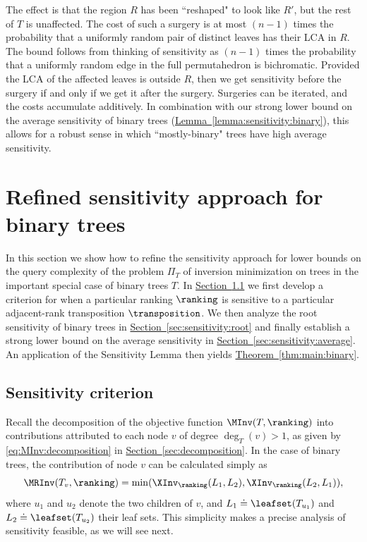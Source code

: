 \documentclass[11pt]{article}
\numberwithin{equation}{section}
\theoremstyle{definition}
\theoremstyle{plain}
\newcommand{\expref}[2]{\hyperref[#2]{#1~\ref{#2}}}
\begin{document}
The effect is that the region $R$ has been ``reshaped" to look like $R'$, but the rest of $T$ is unaffected. The cost of such a surgery is at most $(n-1)$ times the probability that a 
uniformly random pair of distinct leaves has their LCA in $R$. The bound follows from thinking of sensitivity as $(n-1)$ times the probability that a uniformly random edge in the full permutahedron is bichromatic. Provided the LCA of 
the affected leaves is outside $R$, then we get sensitivity before the surgery if and only if we get it after the surgery. Surgeries can be iterated, and the costs accumulate additively. In combination with our strong lower bound on the average sensitivity of binary trees (\expref{Lemma}{lemma:sensitivity:binary}), this allows for a robust sense in which ``mostly-binary" trees have high average sensitivity.



\section{Refined sensitivity approach for binary trees}
\label{sec:sensitivity:binary}

In this section we show how to refine the sensitivity approach for lower bounds on the query complexity of the problem $\Pi_T$ of inversion minimization on trees in the important special case of binary trees $T$. In \expref{Section}{sec:binary:criterion} we first develop a criterion for when a particular ranking $\ranking$ is sensitive to a particular adjacent-rank transposition $\transposition$.
We then analyze the root sensitivity of binary trees in \expref{Section}{sec:sensitivity:root} and finally establish a strong lower bound on the average sensitivity in \expref{Section}{sec:sensitivity:average}. An application of the Sensitivity Lemma then yields \expref{Theorem}{thm:main:binary}.

\subsection{Sensitivity criterion}
\label{sec:binary:criterion}

Recall the decomposition of the objective function $\MInv(T,\ranking)$ into contributions attributed to each node $v$ of degree $\deg_T(v)>1$, as given by \eqref{eq:MInv:decomposition} in \expref{Section}{sec:decomposition}. In the case of binary trees, the contribution of node $v$ can be calculated simply as
\begin{equation}\label{eq:contribution:binary:retake}
\MRInv(T_v,\ranking) = \min(\XInv_\ranking(L_1,L_2),\XInv_\ranking(L_2,L_1)),
\end{equation}
where $u_1$ and $u_2$ denote the two children of $v$, and $L_1 \doteq \leafset(T_{u_1})$ and $L_2 \doteq \leafset(T_{u_2})$ their leaf sets. This simplicity makes a precise analysis of sensitivity feasible, as we will see next. 
\end{document}
